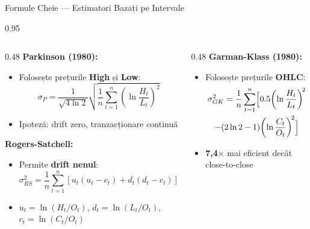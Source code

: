 \documentclass[9pt, aspectratio=169, t]{beamer}
\begin{document}
\begin{frame}[shrink=10]{Formule Cheie --- Estimatori Bazați pe Intervale}
    \begin{cminipage}{0.95\textwidth}
    \begin{columns}[T]
        \begin{column}{0.48\textwidth}
            \textbf{Parkinson (1980):}
            \begin{itemize}\setlength{\itemsep}{0pt}
                \item Folosește prețurile \textbf{High} și \textbf{Low}:
                \[
                \sigma_P = \frac{1}{\sqrt{4\ln 2}}\sqrt{\frac{1}{n}\sum_{t=1}^{n}\!\left(\ln\frac{H_t}{L_t}\right)^{\!2}}
                \]
                \item Ipoteză: drift zero, tranzacționare continuă
            \end{itemize}

            \vspace{0.15cm}

            \textbf{Rogers-Satchell:}
            \begin{itemize}\setlength{\itemsep}{0pt}
                \item Permite \textbf{drift nenul}:
                \[
                \sigma_{RS}^2 = \frac{1}{n}\sum_{t=1}^{n}\!\left[u_t(u_t - c_t) + d_t(d_t - c_t)\right]
                \]
                \item $u_t = \ln(H_t/O_t)$, $d_t = \ln(L_t/O_t)$, $c_t = \ln(C_t/O_t)$
            \end{itemize}
        \end{column}
        \begin{column}{0.48\textwidth}
            \textbf{Garman-Klass (1980):}
            \begin{itemize}\setlength{\itemsep}{0pt}
                \item Folosește prețurile \textbf{OHLC}:
                \begin{multline*}
                \sigma_{GK}^2 = \frac{1}{n}\sum_{t=1}^{n}\Bigl[0.5\!\left(\ln\frac{H_t}{L_t}\right)^{\!2} \\
                - (2\ln 2 - 1)\!\left(\ln\frac{C_t}{O_t}\right)^{\!2}\Bigr]
                \end{multline*}
                \item \textbf{7,4$\times$} mai eficient decât close-to-close
            \end{itemize}

            \vspace{0.15cm}


\end{column}
\end{columns}
\end{cminipage}
\end{frame}
\end{document}
